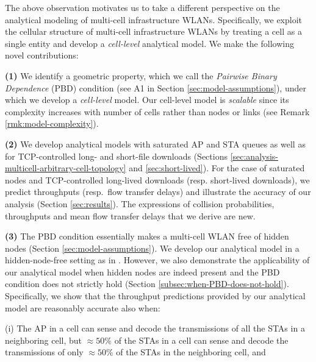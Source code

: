 \documentclass[10pt,a4paper,journal]{IEEEtran}
\theoremstyle{definition}
\theoremstyle{remark}
\theoremstyle{plain}
\begin{document}
The above observation motivates us to take a different perspective on the analytical modeling of multi-cell infrastructure WLANs. Specifically, we exploit the cellular structure of multi-cell infrastructure WLANs by treating a cell as a single entity and develop a \textit{cell-level} analytical model. We make the following novel contributions: 

\vspace{1mm}

\noindent \textbf{(1)} We identify a geometric property, which we call the \textit{Pairwise Binary Dependence} (PBD) condition (see A1 in Section \ref{sec:model-assumptions}), under which we develop a \textit{cell-level} model. Our cell-level model is \textit{scalable} since its complexity increases with number of cells rather than nodes or links (see Remark \ref{rmk:model-complexity}). 

\vspace{1mm}

\noindent \textbf{(2)} We develop analytical models with saturated AP and STA queues as well as for TCP-controlled long- and short-file downloads (Sections \ref{sec:analysis-multicell-arbitrary-cell-topology} and \ref{sec:short-lived}). For the case of saturated nodes and TCP-controlled long-lived downloads (resp. short-lived downloads), we predict throughputs (resp.~flow transfer delays) and illustrate the accuracy of our analysis (Section \ref{sec:results}). The expressions of collision probabilities, throughputs and mean flow transfer delays that we derive are new. 

\vspace{1mm}

\noindent \textbf{(3)} The PBD condition essentially makes a multi-cell WLAN free of hidden nodes (Section \ref{sec:model-assumptions}). We develop our analytical model in a hidden-node-free setting as in \cite{wanet.durvy09selfOrganization,wanet.bonald08multicellprocsharing,wanet.jiang-liew08MobComp-HNEN,wanet.liew_etal09mobicom-capacity-wireless-networks,wanet.liew_etal09ICCback-of-the-envelope}. However, we also demonstrate the applicability of our analytical model when hidden nodes are indeed present and the PBD condition does not strictly hold (Section \ref{subsec:when-PBD-does-not-hold}). Specifically, we show that the throughput predictions provided by our analytical model are reasonably accurate also when: 

\vspace{1mm}

\noindent (i) The AP in a cell can sense and decode the transmissions of all the STAs in a neighboring cell, but $\approx 50\%$ of the STAs in a cell can sense and decode the transmissions of only $\approx 50\%$ of the STAs in the neighboring cell, and 
\end{document}

